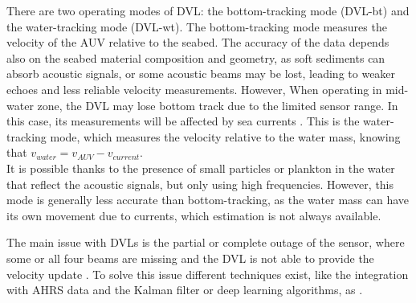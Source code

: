 There are two operating modes of DVL: the bottom-tracking mode (DVL-bt) and the water-tracking mode (DVL-wt). The bottom-tracking mode measures the velocity of the AUV relative to the seabed. 
The accuracy of the data depends also on the seabed material composition and geometry, as soft sediments can absorb acoustic signals, or some acoustic beams may be lost, leading to weaker 
echoes and less reliable velocity measurements. However, When operating in mid-water zone, the DVL may lose bottom track due to the limited sensor range. In this case, its measurements will be affected by sea currents \cite{liuSINSDVLIntegrated2022}.
This is the water-tracking mode, which measures the velocity relative to the water mass, knowing that $v_{water} = v_{AUV} - v_{current}$.\\
It is possible thanks to the presence of small particles or plankton in the water that reflect the acoustic signals, but only using high frequencies. However, this mode is generally less accurate 
than bottom-tracking, as the water mass can have its own movement due to currents, which estimation is not always available.

The main issue with DVLs is the partial or complete outage of the sensor, where some or all four beams are missing and the DVL is not able to provide the velocity update \cite{cohenSetTransformerBeamsNetAUV2022}.
To solve this issue different techniques exist, like the integration with AHRS data and the Kalman filter or deep learning algorithms, as \cite{yampolskyTransformerBasedRobustUnderwater2025}.

